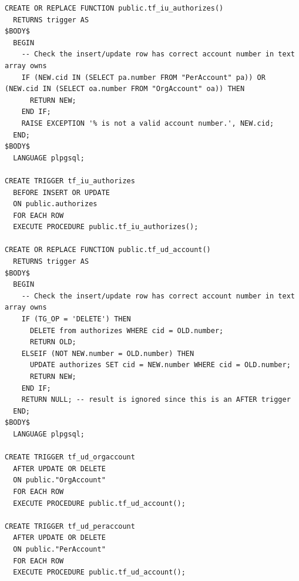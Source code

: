 \documentclass[11pt]{article}
\begin{document}
\begin{verbatim}
CREATE OR REPLACE FUNCTION public.tf_iu_authorizes()
  RETURNS trigger AS
$BODY$
  BEGIN
    -- Check the insert/update row has correct account number in text array owns
    IF (NEW.cid IN (SELECT pa.number FROM "PerAccount" pa)) OR (NEW.cid IN (SELECT oa.number FROM "OrgAccount" oa)) THEN
      RETURN NEW;
    END IF;
    RAISE EXCEPTION '% is not a valid account number.', NEW.cid;
  END;
$BODY$
  LANGUAGE plpgsql;

CREATE TRIGGER tf_iu_authorizes
  BEFORE INSERT OR UPDATE
  ON public.authorizes
  FOR EACH ROW
  EXECUTE PROCEDURE public.tf_iu_authorizes();

CREATE OR REPLACE FUNCTION public.tf_ud_account()
  RETURNS trigger AS
$BODY$
  BEGIN
    -- Check the insert/update row has correct account number in text array owns
    IF (TG_OP = 'DELETE') THEN
      DELETE from authorizes WHERE cid = OLD.number;
      RETURN OLD;
    ELSEIF (NOT NEW.number = OLD.number) THEN
      UPDATE authorizes SET cid = NEW.number WHERE cid = OLD.number;
      RETURN NEW;
    END IF;
    RETURN NULL; -- result is ignored since this is an AFTER trigger
  END;
$BODY$
  LANGUAGE plpgsql;

CREATE TRIGGER tf_ud_orgaccount
  AFTER UPDATE OR DELETE
  ON public."OrgAccount"
  FOR EACH ROW
  EXECUTE PROCEDURE public.tf_ud_account();

CREATE TRIGGER tf_ud_peraccount
  AFTER UPDATE OR DELETE
  ON public."PerAccount"
  FOR EACH ROW
  EXECUTE PROCEDURE public.tf_ud_account();
\end{verbatim}
\fi
\end{document}
